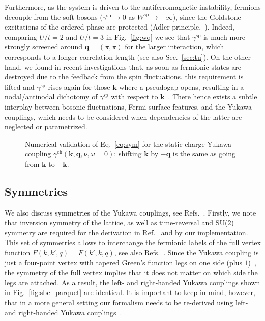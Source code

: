 \documentclass[epj]{svjour}
\newcommand{\kv}{\ensuremath{\mathbf{k}}}
\newcommand{\qv}{\ensuremath{\mathbf{q}}}
\newcommand{\ch}{\ensuremath{\text{ch}}}
\newcommand{\sz}{\ensuremath{\text{sp}}}
\begin{document}
Furthermore, as the system is driven to the antiferromagnetic instability, fermions decouple from the soft bosons
($\gamma^\sz\rightarrow0$ as $W^\sz\rightarrow-\infty$),
since the Goldstone excitations of the ordered phase are protected (Adler principle,~\cite{Adler65,Schrieffer95}).
Indeed, comparing $U/t=2$ and $U/t=3$ in Fig.~\ref{fig:wq}
we see that $\gamma^\sz$ is much more strongly screened around $\qv=(\pi,\pi)$ for the larger interaction,
which corresponds to a longer correlation length {(see also Sec.~\ref{sec:tu})}.
On the other hand, we found in recent investigations that, as soon as fermionic states are destroyed due
to the feedback from the spin fluctuations, this requirement is lifted and $\gamma^\sz$ rises again for those
$\kv$ where a pseudogap opens, resulting in a nodal/antinodal dichotomy
of $\gamma^\sz$ with respect to $\kv$~\cite{Krien20-2,Krien21}.
There hence exists a subtle interplay between bosonic fluctuations, Fermi surface features, and the Yukawa couplings,
which needs to be considered when dependencies of the latter are neglected or parametrized.

\begin{figure}
  \begin{center}
\end{center}
    \caption{\label{fig:sym} Numerical validation of Eq.~\eqref{eq:sym} for the static charge Yukawa coupling
    $\gamma^\ch(\kv,\qv,\nu,\omega=0)$: shifting $\kv$ by $-\qv$ is the same as going from $\kv$ to $-\kv$.
    }
\end{figure}

\subsection{Symmetries}
We also discuss symmetries of the Yukawa couplings, see Refs.~\cite{vanLoon18,Rohringerthesis}.
Firstly, we note that inversion symmetry of the lattice,
as well as time-reversal and SU($2$) symmetry are required
for the derivation in Ref.~\cite{Krien21-2} and by our implementation.
This set of symmetries allows to interchange the fermionic labels of the full vertex function $F(k,k',q)=F(k',k,q)$,
see also Refs.~\cite{Rohringer12,Rohringerthesis}. Since the Yukawa coupling is just a four-point vertex with tapered
Green's function legs on one side (plus $1$)~\cite{Krien21-2}, the symmetry of the full vertex implies that it does not matter on which side the legs are attached.
As a result, the left- and right-handed Yukawa couplings shown in Fig.~\ref{fig:sbe_parquet} are identical.
It is important to keep in mind, however, that in a more general setting our formalism needs to be re-derived using left- and right-handed Yukawa couplings~\cite{Bonetti22,Walter22}.
\end{document}
